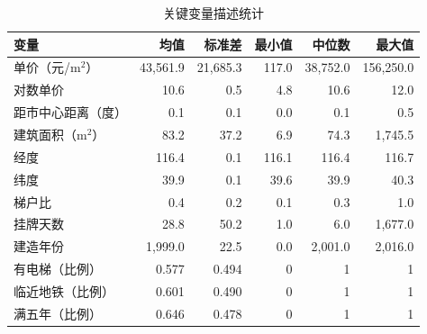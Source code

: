 \begin{table}[H]
\centering
\caption{关键变量描述统计}
\label{tab:descriptive_stats}
\begin{tabular}{lrrrrr}
\toprule
变量 & 均值 & 标准差 & 最小值 & 中位数 & 最大值 \\
\midrule
单价（元/m$^2$） & 43,561.9 & 21,685.3 & 117.0 & 38,752.0 & 156,250.0 \\
对数单价 & 10.6 & 0.5 & 4.8 & 10.6 & 12.0 \\
距市中心距离（度） & 0.1 & 0.1 & 0.0 & 0.1 & 0.5 \\
建筑面积（m$^2$） & 83.2 & 37.2 & 6.9 & 74.3 & 1,745.5 \\
经度 & 116.4 & 0.1 & 116.1 & 116.4 & 116.7 \\
纬度 & 39.9 & 0.1 & 39.6 & 39.9 & 40.3 \\
梯户比 & 0.4 & 0.2 & 0.1 & 0.3 & 1.0 \\
挂牌天数 & 28.8 & 50.2 & 1.0 & 6.0 & 1,677.0 \\
建造年份 & 1,999.0 & 22.5 & 0.0 & 2,001.0 & 2,016.0 \\
有电梯（比例） & 0.577 & 0.494 & 0 & 1 & 1 \\
临近地铁（比例） & 0.601 & 0.490 & 0 & 1 & 1 \\
满五年（比例） & 0.646 & 0.478 & 0 & 1 & 1 \\
\bottomrule
\end{tabular}
\end{table}